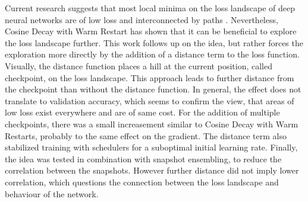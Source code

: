 Current research suggests that most local minima on the loss landscape of deep
neural networks are of low loss and interconnected by paths
\cite{choromanska2015loss} \cite{draxler2018essentially} \cite{he2020piecewise}.
Nevertheless, Cosine Decay with Warm Restart \cite{loshchilov2016sgdr} has shown
that it can be beneficial to explore the loss landscape further. This work
follows up on the idea, but rather forces the exploration more directly by the
addition of a distance term to the loss function. Visually, the distance
function places a hill at the current position, called checkpoint, on the loss
landscape. This approach leads to further distance from the checkpoint than
without the distance function. In general, the effect does not translate to
validation accuracy, which seems to confirm the view, that areas of low loss
exist everywhere and are of same cost. For the addition of multiple checkpoints,
there was a small increasement similar to Cosine Decay with Warm Restarts,
probably to the same effect on the gradient. The distance term also stabilized
training with schedulers for a suboptimal initial learning rate. Finally, the
idea was tested in combination with snapshot ensembling, to reduce the
correlation between the snapshots. However further distance did not imply lower
correlation, which questions the connection between the loss landscape and
behaviour of the network.